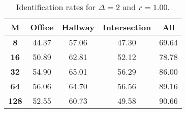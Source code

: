 \begin{table}[h]
    \footnotesize
    \centering
    \begin{tabular}{|c|c|c|c|l|}    
    \hline
    {\bf M} & {\bf Office} & {\bf Hallway} & {\bf Intersection} &     \multicolumn{1}{c|}{{\bf All}} \\ \hline
    {\bf 8} & 44.37 & 57.06 & 47.30 & 69.64 \\ \hline
    {\bf 16} & 50.89 & 62.81 & 52.12 & 78.78 \\ \hline
    {\bf 32} & 54.90 & 65.01 & 56.29 & 86.00 \\ \hline
    {\bf 64} & 56.06 & 64.70 & 56.56 & 89.16 \\ \hline
    {\bf 128} & 52.55 & 60.73 & 49.58 & 90.66 \\ \hline
    \end{tabular}
    \caption{Identification rates for $\Delta = 2$ and $r = 1.00$.}    
    \label{tab:identify_speakers_1.00_mit_19_2}
\end{table}
